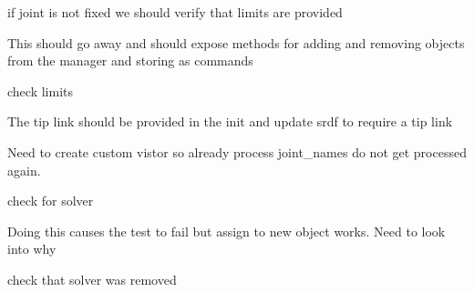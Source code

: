 \begin{DoxyRefList}
%
if joint is not fixed we should verify that limits are provided  
\item[Member \mbox{\hyperlink{classtesseract__environment_1_1Environment_a7f10ded105cbd32151631123466f8fbd}{tesseract\+\_\+environment\+::Environment\+::get\+Manipulator\+Manager}} ()]\label{todo__todo000005}%
%
This should go away and should expose methods for adding and removing objects from the manager and storing as commands  
\item[Member \mbox{\hyperlink{classtesseract__environment_1_1ReplaceJointCommand_a9fdde52130fe2aa8cfeb09138b1ebac6}{tesseract\+\_\+environment\+::Replace\+Joint\+Command\+::Replace\+Joint\+Command}} (const \mbox{\hyperlink{classtesseract__scene__graph_1_1Joint}{tesseract\+\_\+scene\+\_\+graph\+::\+Joint}} \&joint)]\label{todo__todo000004}%
%
check limits  
\item[Class \mbox{\hyperlink{classtesseract__kinematics_1_1KDLFwdKinTree}{tesseract\+\_\+kinematics\+::KDLFwd\+Kin\+Tree}} ]\label{todo__todo000026}%
%
The tip link should be provided in the init and update srdf to require a tip link  
\item[Member \mbox{\hyperlink{classtesseract__scene__graph_1_1SceneGraph_a3d78ee8fc4abe4542a4d4f5195a972c5}{tesseract\+\_\+scene\+\_\+graph\+::Scene\+Graph\+::get\+Joint\+Children\+Names}} (const std\+::vector$<$ std\+::string $>$ \&names) const]\label{todo__todo000027}%
%
Need to create custom vistor so already process joint\+\_\+names do not get processed again.  
\item[Member \mbox{\hyperlink{tesseract__environment__manipulator__manager__unit_8cpp_ae8cf17c756efd476435f680aab4a9eda}{TEST}} (Tesseract\+Environment\+Manipulator\+Manager\+Unit, Add\+Remove\+ROPKinematics\+Solver\+Unit)]\label{todo__todo000018}%
%
check for solver  
\item[Member \mbox{\hyperlink{tesseract__scene__graph__unit_8cpp_a07e5d7fb0413d0780df4b637bcd35845}{TEST}} (Tesseract\+Scene\+Graph\+Unit, Tesseract\+Scene\+Graph\+Remove\+Link\+Unit)]\label{todo__todo000028}%
%
Doing this causes the test to fail but assign to new object works. Need to look into why  
\item[Member \mbox{\hyperlink{tesseract__environment__manipulator__manager__unit_8cpp_a814d8bacce1a47948ea8185be335f12c}{TEST}} (Tesseract\+Environment\+Manipulator\+Manager\+Unit, Add\+Remove\+OPWKinematics\+Solver\+Unit)]\label{todo__todo000023}%
%
check that solver was removed 


\end{DoxyRefList}

